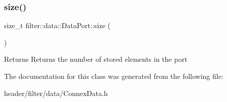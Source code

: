 \subsubsection{\texorpdfstring{size()}{size()}}
{\footnotesize\ttfamily size\+\_\+t filter\+::data\+::\+Data\+Port\+::size (\begin{DoxyParamCaption}{ }\end{DoxyParamCaption})\hspace{0.3cm}{\ttfamily [inline]}}

\begin{DoxyReturn}{Returns}
Returns the number of stored elements in the port 
\end{DoxyReturn}


The documentation for this class was generated from the following file\+:\begin{DoxyCompactItemize}
\item 
header/filter/data/Connex\+Data.\+h\end{DoxyCompactItemize}
